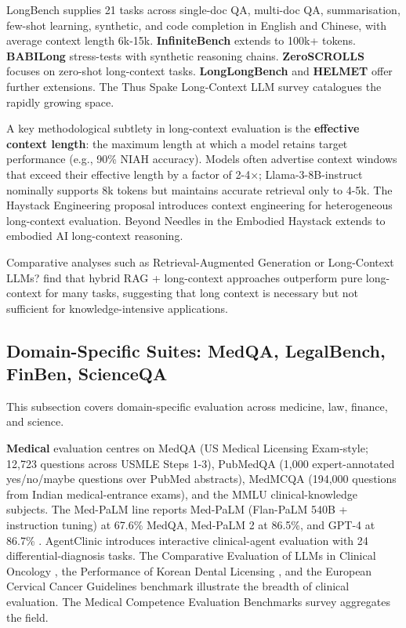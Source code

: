 \documentclass{article}
\begin{document}
LongBench \citep{bai20222022} supplies 21 tasks across single-doc QA, multi-doc QA, summarisation, few-shot learning, synthetic, and code completion in English and Chinese, with average context length 6k-15k. \textbf{InfiniteBench} extends to 100k+ tokens. \textbf{BABILong} stress-tests with synthetic reasoning chains. \textbf{ZeroSCROLLS} focuses on zero-shot long-context tasks. \textbf{LongLongBench} and \textbf{HELMET} offer further extensions. The Thus Spake Long-Context LLM survey \cite{liu20252025} catalogues the rapidly growing space.

A key methodological subtlety in long-context evaluation is the \textbf{effective context length}: the maximum length at which a model retains target performance (e.g., 90\% NIAH accuracy). Models often advertise context windows that exceed their effective length by a factor of 2-4×; Llama-3-8B-instruct nominally supports 8k tokens but maintains accurate retrieval only to 4-5k. The Haystack Engineering proposal \cite{li20252025} introduces context engineering for heterogeneous long-context evaluation. Beyond Needles in the Embodied Haystack \cite{kim2025beyondneedlesinthe} extends to embodied AI long-context reasoning.

Comparative analyses such as Retrieval-Augmented Generation or Long-Context LLMs? \cite{li20242024} find that hybrid RAG + long-context approaches outperform pure long-context for many tasks, suggesting that long context is necessary but not sufficient for knowledge-intensive applications.

\subsection{Domain-Specific Suites: MedQA, LegalBench, FinBen, ScienceQA}\label{domain-specific-suites-medqa-legalbench-finben-scienceqa}

This subsection covers domain-specific evaluation across medicine, law, finance, and science.

\textbf{Medical} evaluation centres on MedQA (US Medical Licensing Exam-style; 12,723 questions across USMLE Steps 1-3), PubMedQA (1,000 expert-annotated yes/no/maybe questions over PubMed abstracts), MedMCQA (194,000 questions from Indian medical-entrance exams), and the MMLU clinical-knowledge subjects. The Med-PaLM line \cite{singhal20232023,singhal20252025} reports Med-PaLM (Flan-PaLM 540B + instruction tuning) at 67.6\% MedQA, Med-PaLM 2 at 86.5\%, and GPT-4 at 86.7\% \cite{nori2023capabilitiesofgpt4}. AgentClinic \cite{schmidgall20262026} introduces interactive clinical-agent evaluation with 24 differential-diagnosis tasks. The Comparative Evaluation of LLMs in Clinical Oncology \cite{rydzewski20242024}, the Performance of Korean Dental Licensing \cite{kim2025beyondneedlesinthe}, and the European Cervical Cancer Guidelines benchmark \cite{pavone20262026} illustrate the breadth of clinical evaluation. The Medical Competence Evaluation Benchmarks survey \cite{wang20262026} aggregates the field.
\end{document}
